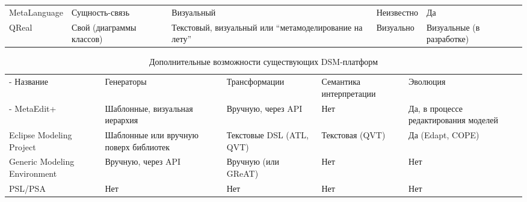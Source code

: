 \begin{table}[ht]
\begin{small}
\begin{longtabu} {| X[1 l p] | X[1 l p] | X[1 l p] | X[1 l p] |X[1 l p] |}
		MetaLanguage                 & Сущность-связь                  & Визуальный                                              & Неизвестно                                               & Да                                             \\
		 QReal  & Свой (диаграммы классов)        & Текстовый, визуальный или "`метамоделирование на лету"' & Визуально                                                & Визуальные (в разработке)                       
		\label{tab:existingPlatformsMain}
	\end{longtabu}
\end{small}
\end{table}

\begin{table}[ht]
\begin{small}
	\begin{longtabu} {| X[1 l p] | X[1 l p] | X[1 l p] | X[1 l p] | X[1 l p] |}
		\caption{Дополнительные возможности существующих DSM-платформ} \\
		\tabucline-
		 Название                    & Генераторы                                    & Трансформации                                  & Семантика интерпретации                             & Эволюция                                                                   \\
		\tabucline-
		\everyrow{\tabucline-}
		MetaEdit+                    & Шаблонные, визуальная иерархия                & Вручную, через API                             & Нет                                                 & Да, в процессе редактирования моделей                                      \\
		Eclipse Modeling Project     & Шаблонные или вручную поверх библиотек        & Текстовые DSL (ATL, QVT)                       & Текстовая (QVT)                                     & Да (Edapt, COPE)                                                           \\
		Generic Modeling Environment & Вручную, через API                            & Вручную (или GReAT)                            & Нет                                                 & Нет                                                                        \\
		PSL/PSA                      & Нет                                           & Нет                                            & Нет                                                 & Нет                                                                        \\

\end{longtabu}
\end{small}
\end{table}
